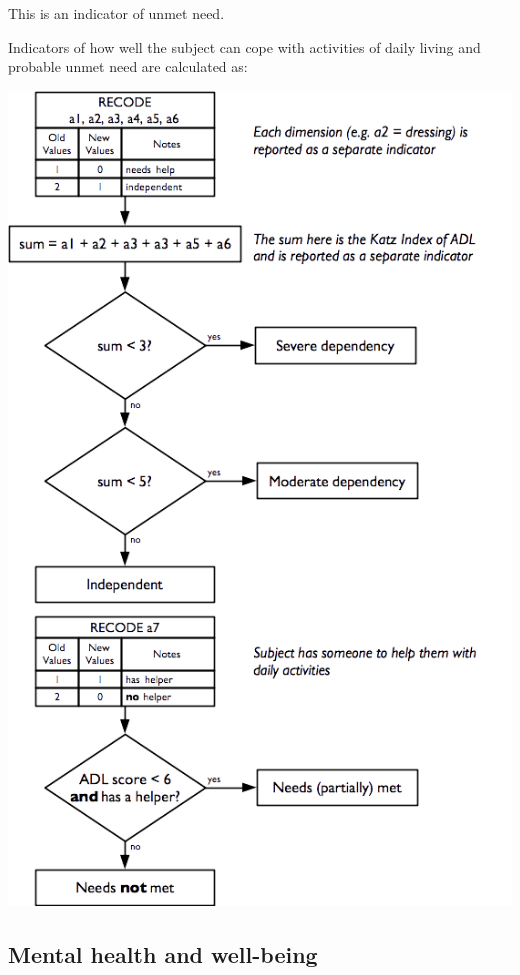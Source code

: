\documentclass[12pt,a4paper]{book}
\theoremstyle{definition}
\theoremstyle{definition}
\theoremstyle{definition}
\theoremstyle{remark}
\begin{document}
This is an indicator of unmet need.

\newpage

Indicators of how well the subject can cope with activities of daily
living and probable unmet need are calculated as:

\begin{center}\includegraphics[width=7.68in]{figures/indicators18} \end{center}

\hypertarget{mental-health-and-well-being}{%
\subsection{Mental health and
well-being}\label{mental-health-and-well-being}}
\end{document}
